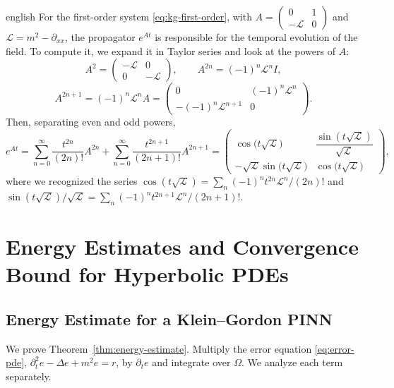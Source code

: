\documentclass[12pt,letterpaper,twoside]{book}
\begin{document}
\begin{hyphenrules}{english}
For the first-order system \eqref{eq:kg-first-order}, with $A=\begin{pmatrix}0&1\\-\mathcal{L}&0\end{pmatrix}$
and $\mathcal{L}=m^2-\partial_{xx}$, the propagator $e^{At}$ is responsible for the temporal evolution of
the field. To compute it, we expand it in Taylor series and look at the powers of $A$:
\[
  A^2=\begin{pmatrix}-\mathcal{L} & 0\\ 0 & -\mathcal{L}\end{pmatrix},\qquad
  A^{2n}=(-1)^n\mathcal{L}^{n}I,
\]
\[
  A^{2n+1}=(-1)^n\mathcal{L}^{n}A=\begin{pmatrix}0 & (-1)^n\mathcal{L}^{n}\\ -(-1)^n\mathcal{L}^{n+1} & 0\end{pmatrix}.
\]
Then, separating even and odd powers,
\begin{equation}
  e^{At}=\sum_{n=0}^{\infty}\frac{t^{2n}}{(2n)!}A^{2n}+\sum_{n=0}^{\infty}\frac{t^{2n+1}}{(2n+1)!}A^{2n+1}
  =\begin{pmatrix}
    \cos\big(t\sqrt{\mathcal{L}}\big) & \dfrac{\sin(t\sqrt{\mathcal{L}})}{\sqrt{\mathcal{L}}}\\[2mm]
    -\sqrt{\mathcal{L}}\sin\big(t\sqrt{\mathcal{L}}\big) & \cos\big(t\sqrt{\mathcal{L}}\big)
  \end{pmatrix},
  \label{eq:app-kg-propagator}
\end{equation}
where we recognized the series
$\cos(t\sqrt{\mathcal{L}})=\sum_n(-1)^nt^{2n}\mathcal{L}^n/(2n)!$ and
$\sin(t\sqrt{\mathcal{L}})/\sqrt{\mathcal{L}}=\sum_n(-1)^nt^{2n+1}\mathcal{L}^n/(2n+1)!$.

\chapter{Energy Estimates and Convergence Bound for Hyperbolic PDEs}\label{app:derivations}

\section{Energy Estimate for a Klein--Gordon PINN}\label{app:energy}

We prove Theorem~\ref{thm:energy-estimate}. Multiply the error equation \eqref{eq:error-pde},
$\partial_t^2e-\Delta e+m^2e=r$, by $\partial_te$ and integrate over $\Omega$. We analyze each term
separately.


\end{hyphenrules}
\end{document}
